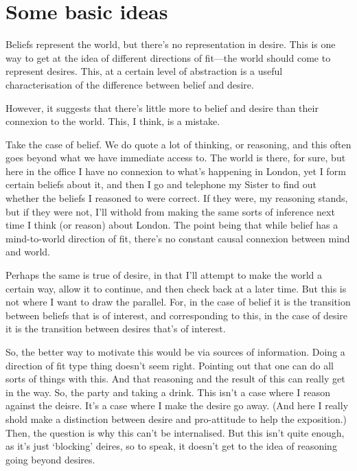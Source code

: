 \documentclass[10pt]{article}
\begin{document}
\section{Some basic ideas}
\label{sec:some-basic-ideas}

Beliefs represent the world, but there's no representation in desire.
This is one way to get at the idea of different directions of fit---the world should come to represent desires.
This, at a certain level of abstraction is a useful characterisation of the difference between belief and desire.

However, it suggests that there's little more to belief and desire than their connexion to the world.
This, I think, is a mistake.

Take the case of belief.
We do quote a lot of thinking, or reasoning, and this often goes beyond what we have immediate access to.
The world is there, for sure, but here in the office I have no connexion to what's happening in London, yet I form certain beliefs about it, and then I go and telephone my Sister to find out whether the beliefs I reasoned to were correct.
If they were, my reasoning stands, but if they were not, I'll withold from making the same sorts of inference next time I think (or reason) about London.
The point being that while belief has a mind-to-world direction of fit, there's no constant causal connexion between mind and world.

Perhaps the same is true of desire, in that I'll attempt to make the world a certain way, allow it to continue, and then check back at a later time.
But this is not where I want to draw the parallel.
For, in the case of belief it is the transition between beliefs that is of interest, and corresponding to this, in the case of desire it is the transition between desires that's of interest.

So, the better way to motivate this would be via sources of information.
Doing a direction of fit type thing doesn't seem right.
Pointing out that one can do all sorts of things with this.
And that reasoning and the result of this can really get in the way.
So, the party and taking a drink.
This isn't a case where I reason against the deisre.
It's a case where I make the desire go away.
(And here I really shold make a distinction between desire and pro-attitude to help the exposition.)
Then, the question is why this can't be internalised.
But this isn't quite enough, as it's just `blocking' deires, so to speak, it doesn't get to the idea of reasoning going beyond desires.
\end{document}
